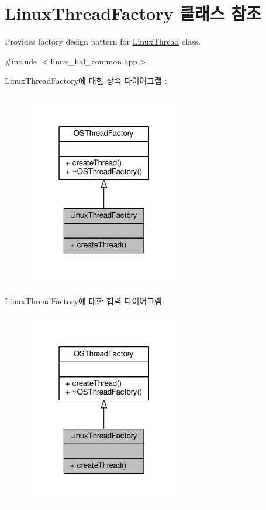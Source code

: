 \hypertarget{class_linux_thread_factory}{}\section{Linux\+Thread\+Factory 클래스 참조}
\label{class_linux_thread_factory}


Provides factory design pattern for \hyperlink{class_linux_thread}{Linux\+Thread} class.  




{\ttfamily \#include $<$linux\+\_\+hal\+\_\+common.\+hpp$>$}



Linux\+Thread\+Factory에 대한 상속 다이어그램 \+: 
\nopagebreak
\begin{figure}[H]
\begin{center}
\leavevmode
\includegraphics[width=195pt]{class_linux_thread_factory__inherit__graph}
\end{center}
\end{figure}


Linux\+Thread\+Factory에 대한 협력 다이어그램\+:
\nopagebreak
\begin{figure}[H]
\begin{center}
\leavevmode
\includegraphics[width=195pt]{class_linux_thread_factory__coll__graph}
\end{center}
\end{figure}
